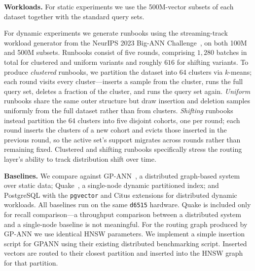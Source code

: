 \documentclass[sigconf,review,anonymous]{acmart}
\begin{document}
\textbf{Workloads.} For static experiments we use the 500M-vector subsets of each dataset together with the standard query sets. 

For dynamic experiments we generate runbooks using the streaming-track workload generator from the NeurIPS 2023 Big-ANN Challenge~\cite{simhadri2024results}, on both 100M and 500M subsets. Runbooks consist of five rounds, comprising $1{,}280$ batches in total for clustered and uniform variants and roughly $616$ for shifting variants. To produce \emph{clustered} runbooks, we partition the dataset into 64 clusters via $k$-means; each round visits every cluster---inserts
a sample from the cluster, runs the full query set, deletes a fraction of the cluster, and runs the query set again. \emph{Uniform} runbooks share the same outer structure but draw insertion and deletion samples uniformly from the full dataset rather than from clusters. \emph{Shifting} runbooks instead partition the 64 clusters into five disjoint cohorts, one per round; each round inserts the clusters of a new cohort and evicts those inserted in the previous round, so the active set's support migrates across rounds rather than remaining fixed. Clustered and shifting runbooks specifically stress the routing layer's ability to track distribution shift over time.


 \textbf{Baselines.} We compare against GP-ANN~\cite{gottesbueren2025unleashing}, a distributed graph-based system over static data; Quake~\cite{mohoney2025quake}, a single-node dynamic partitioned index; and PostgreSQL with the \texttt{pgvector} and Citus extensions \cite{postgresql,pgvector,cubukcu2021citus} for distributed dynamic workloads. All baselines run on the same \texttt{d6515} hardware. Quake \cite{mohoney2025quake} is included only for recall comparison---a throughput comparison between a distributed system and a single-node baseline is not meaningful. For the routing graph produced by GP-ANN we use identical HNSW parameters. We implement a simple insertion script for GPANN using their existing distributed benchmarking script. Inserted vectors are routed to their closest partition and inserted into the HNSW graph for that partition.
\end{document}
